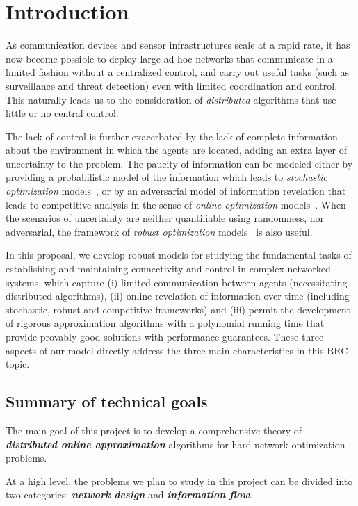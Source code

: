 \section{Introduction}

As communication devices and sensor infrastructures scale at a rapid
rate, it has now become possible to deploy large ad-hoc networks that
communicate in a limited fashion without a centralized control, and
carry out useful tasks (such as surveillance and threat detection)
even with limited coordination and control. This naturally leads us to
the consideration of {\em distributed} algorithms that use little or
no central control.

The lack of control is further exacerbated by the lack of complete
information about the environment in which the agents are located,
adding an extra layer of uncertainty to the problem. The paucity of
information can be modeled either by providing a probabilistic model
of the information which leads to {\em stochastic optimization}
models~\cite{bl97,rs06}, or by an adversarial model of information
revelation that leads to competitive analysis in the sense of {\em online
optimization} models~\cite{be98}. When the scenarios of uncertainty are neither quantifiable using randomness, nor adversarial, the framework of {\em robust optimization} models~\cite{dgrs05} is also useful.

In this proposal, we develop robust models for studying the
fundamental tasks of establishing and maintaining connectivity and
control in complex networked systems, which capture (i) limited
communication between agents (necessitating distributed algorithms),
(ii) online revelation of information over time (including stochastic,
robust and competitive frameworks) and (iii) permit the development of
rigorous approximation algorithms with a polynomial running time that
provide provably good solutions with performance guarantees. These
three aspects of our model directly address the three main
characteristics in this BRC topic.

\subsection{Summary of technical goals}
\label{sec:goals}

The main goal of this project is to develop a comprehensive theory of
{\bf \em distributed online approximation}\/ algorithms for hard network
optimization problems.
\iffalse (Repeats what is in the prev para)
This proposal encompasses several challenging
aspects of mission-critical networked systems: (a) there is
considerable uncertainty in the inputs and the network environment
under which the systems operate; (b) the inputs as well as the
underlying network may, in fact, be under adversarial control; (c) the
algorithms running these networked systems need to be
fully-distributed.
\fi
At a high level, the problems we plan to study in this project can be
divided into two categories: {\bf \em network design}\/ and {\bf \em
information flow}.

